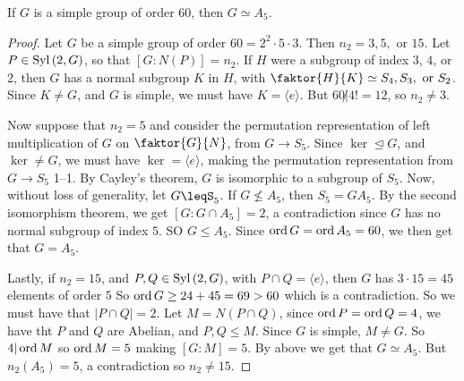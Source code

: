 \begin{theorem}\label{theorem_4.6.2}
  If $G$ is a simple group of order  $60$, then  $G \simeq A_5$.
\end{theorem}
\begin{proof}
  Let $G$ be a simple group of order  $60=2^2 \cdot 5 \cdot 3$. Then
  $n_2=3,5, \text{ or } 15$. Let $P \in \operatorname{Syl}{(2,G)}$, so that $[G:N(P)]=n_2$.
  If $H$ were a subgroup of index $3$, $4$, or $2$, then $G$ has a normal
  subgroup  $K$ in  $H$, with  $\faktor{H}{K} \simeq S_4, S_3, \text{ or
  }S_2$. Since $K \neq G$, and  $G$ is simple, we must have $K=\langle e
  \rangle$. But $60 \not| 4!=12$, so  $n_2 \neq 3$.

  Now suppose that $n_2=5$ and consider the permutation representation of left
  multiplication of $G$ on  $\faktor{G}{N}$, from $G \xrightarrow{} S_5$.
  Since $\ker \unlhd G$, and $\ker \neq G$, we must have $\ker=\langle e
  \rangle$, making the permutation representation from $G \xrightarrow{} S_5$
  1--1. By Cayley's theorem, $G$ is isomorphic to a subgroup of  $S_5$. Now,
  without loss of generality, let $G \leqS_5$. If $G \not\leq A_5$, then
  $S_5=GA_5$. By the second isomorphism theorem, we get $[G: G \cap A_5]=2$, a
  contradiction since $G$ has no normal subgroup of index  $5$. SO  $G \leq
  A_5$. Since $\operatorname{ord}{G}=\operatorname{ord}{A_5}=60$, we then get that $G=A_5$.

  Lastly, if $n_2=15$, and $P,Q \in \operatorname{Syl}{(2,G)}$, with $P \cap Q=\langle e
  \rangle$, then $G$ has  $3 \cdot 15=45$ elements of order $5$ So $\operatorname{ord}{G}
  \geq 24+45=69>60$ which is a contradiction. So we must have that $|P \cap
  Q|=2$. Let  $M=N(P \cap Q)$, since $\operatorname{ord}{P}=\operatorname{ord}{Q}=4$, we have tht $P$ and
  $Q$ are Abelian, and  $P,Q \leq M$. Since  $G$ is simple,  $M \neq G$. So
  $4|\operatorname{ord}{M}$ so $\operatorname{ord}{M}=5$ making $[G:M]=5$. By above we get that $G \simeq
  A_5$. But $n_2(A_5)=5$, a contradiction so $n_2 \neq 15$.
\end{proof}
